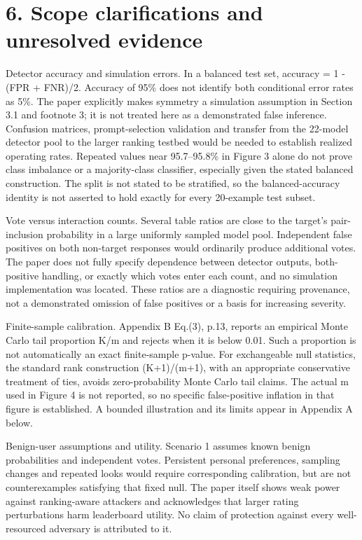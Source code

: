\documentclass[10pt]{article}
\begin{document}
\section*{6. Scope clarifications and unresolved evidence}
Detector accuracy and simulation errors. In a balanced test set, accuracy = 1 - (FPR + FNR)/2. Accuracy of 95\% does not identify both conditional error rates as 5\%. The paper explicitly makes symmetry a simulation assumption in Section 3.1 and footnote 3; it is not treated here as a demonstrated false inference. Confusion matrices, prompt-selection validation and transfer from the 22-model detector pool to the larger ranking testbed would be needed to establish realized operating rates. Repeated values near 95.7–95.8\% in Figure 3 alone do not prove class imbalance or a majority-class classifier, especially given the stated balanced construction. The split is not stated to be stratified, so the balanced-accuracy identity is not asserted to hold exactly for every 20-example test subset.\par
Vote versus interaction counts. Several table ratios are close to the target’s pair-inclusion probability in a large uniformly sampled model pool. Independent false positives on both non-target responses would ordinarily produce additional votes. The paper does not fully specify dependence between detector outputs, both-positive handling, or exactly which votes enter each count, and no simulation implementation was located. These ratios are a diagnostic requiring provenance, not a demonstrated omission of false positives or a basis for increasing severity.\par
Finite-sample calibration. Appendix B Eq.(3), p.13, reports an empirical Monte Carlo tail proportion K/m and rejects when it is below 0.01. Such a proportion is not automatically an exact finite-sample p-value. For exchangeable null statistics, the standard rank construction (K+1)/(m+1), with an appropriate conservative treatment of ties, avoids zero-probability Monte Carlo tail claims. The actual m used in Figure 4 is not reported, so no specific false-positive inflation in that figure is established. A bounded illustration and its limits appear in Appendix A below.\par
Benign-user assumptions and utility. Scenario 1 assumes known benign probabilities and independent votes. Persistent personal preferences, sampling changes and repeated looks would require corresponding calibration, but are not counterexamples satisfying that fixed null. The paper itself shows weak power against ranking-aware attackers and acknowledges that larger rating perturbations harm leaderboard utility. No claim of protection against every well-resourced adversary is attributed to it.\par
\end{document}
